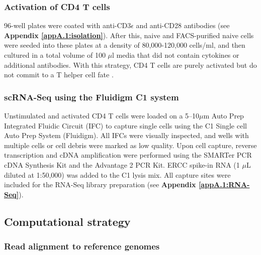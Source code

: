 \newpage

\subsubsection{Activation of CD4\plus{} T cells}

96-well plates were coated with anti-CD3$\epsilon$ and anti-CD28 antibodies (see \textbf{Appendix \ref{appA.1:isolation}}). After this, naive and FACS-purified naive cells were seeded into these plates at a density of 80,000-120,000 cells/ml, and then cultured in a total volume of 100 $\mu$l media that did not contain cytokines or additional antibodies. With this strategy, CD4\plus{} T cells are purely activated but do not commit to a T helper cell fate \citep{Stubbington2015, Zhu2010}.

\subsubsection{scRNA-Seq using the Fluidigm C1 system}

Unstimulated and activated CD4\plus{} T cells were loaded on a 5–10$\mu$m Auto Prep Integrated Fluidic Circuit (IFC) to capture single cells using the C1 Single cell Auto Prep System (Fluidigm). All IFCs were visually inspected, and wells with multiple cells or cell debris were marked as low quality. Upon cell capture, reverse transcription and cDNA amplification were performed using the SMARTer PCR cDNA Synthesis Kit and the Advantage 2 PCR Kit. ERCC spike-in RNA (1 $\mu$L diluted at 1:50,000) was added to the C1 lysis mix. All capture sites were included for the RNA-Seq library preparation (see \textbf{Appendix \ref{appA.1:RNA-Seq}}).

\subsection{Computational strategy}

\subsubsection{Read alignment to reference genomes}

